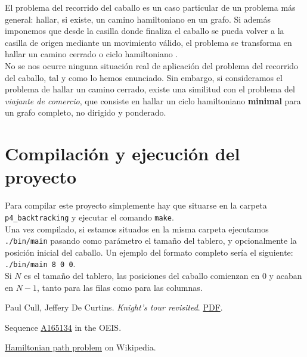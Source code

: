 \documentclass[11pt]{article}
\begin{document}
El problema del recorrido del caballo es un caso particular de un problema más general: hallar, si existe, un camino hamiltoniano \cite{wiki} en un grafo. Si además imponemos que desde la casilla donde finaliza el caballo se pueda volver a la casilla de origen mediante un movimiento válido, el problema se transforma en hallar un camino cerrado o ciclo hamiltoniano \cite{wiki}.\\

No se nos ocurre ninguna situación real de aplicación del problema del recorrido del caballo, tal y como lo hemos enunciado. Sin embargo, si consideramos el problema de hallar un camino cerrado, existe una similitud con el problema del \textit{viajante de comercio}, que consiste en hallar un ciclo hamiltoniano \textbf{minimal} para un grafo completo, no dirigido y ponderado.\\

\section*{Compilación y ejecución del proyecto}
Para compilar este proyecto simplemente hay que situarse en la carpeta \verb|p4_backtracking| y ejecutar el comando \verb|make|.\\

Una vez compilado, si estamos situados en la misma carpeta ejecutamos \verb|./bin/main| pasando como parámetro el tamaño del tablero, y opcionalmente la posición inicial del caballo. Un ejemplo del formato completo sería el siguiente: \verb|./bin/main 8 0 0|.\\

Si $N$ es el tamaño del tablero, las posiciones del caballo comienzan en $0$ y acaban en $N-1$, tanto para las filas como para las columnas.

\begin{thebibliography}{9}

  Paul Cull, Jeffery De Curtins. 
  \emph{Knight's tour revisited}.
   \href{http://www.fq.math.ca/Scanned/16-3/cull.pdf}{PDF}.

  Sequence
  \href{https://oeis.org/A165134}{A165134} in the OEIS.
  
  \href{https://en.wikipedia.org/wiki/Hamiltonian_path_problem}{Hamiltonian path problem} on Wikipedia.

\end{thebibliography}
\end{document}
